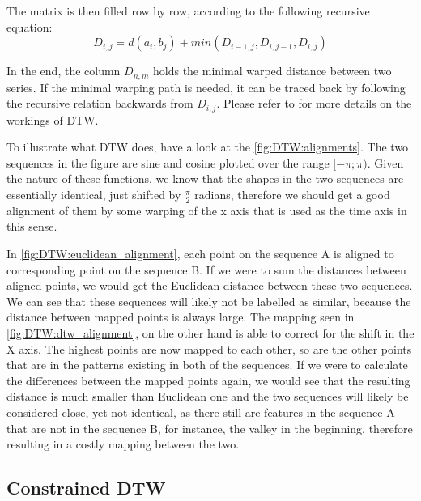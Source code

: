 \documentclass[parskip]{cs4rep}
\begin{document}
The matrix is then filled row by row, according to the following recursive equation:
$$D_{i,j} = d(a_i, b_j) + min(D_{i-1, j}, D_{i, j-1}, D_{i,j})$$

In the end, the column $D_{n,m}$ holds the minimal warped distance between two series.
If the minimal warping path is needed, it can be traced back by following the recursive relation backwards from $D_{i,j}$. Please refer to \citep{Muller:2007bo} for more details on the workings of DTW.

To illustrate what DTW does, have a look at the \autoref{fig:DTW:alignments}. The two sequences in the figure are sine and cosine plotted over the range $[-\pi; \pi)$. Given the nature of these functions, we know that the shapes in the two sequences are essentially identical, just shifted by $\frac{\pi}{2}$ radians, therefore we should get a good alignment of them by some warping of the x axis that is used as the time axis in this sense.

In \autoref{fig:DTW:euclidean_alignment}, each point on the sequence A is aligned to corresponding point on the sequence B. If we were to sum the distances between aligned points, we would get the Euclidean distance between these two sequences. We can see that these sequences will likely not be labelled as similar, because the distance between mapped points is always large. The mapping seen in \autoref{fig:DTW:dtw_alignment}, on the other hand is able to correct for the shift in the X axis. 
The highest points are now mapped to each other, so are the other points that are in the patterns existing in both of the sequences. If we were to calculate the differences between the mapped points again, we would see that the resulting distance is much smaller than Euclidean one and the two sequences will likely be considered close, yet not identical, as there still are features in the sequence A that are not in the sequence B, for instance, the valley in the beginning, therefore resulting in a costly mapping between the two.

\subsection{Constrained DTW}
\end{document}
